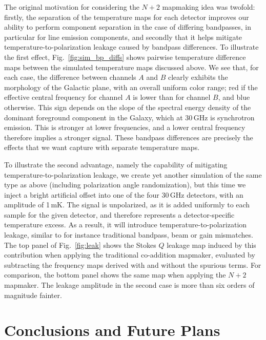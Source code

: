 \documentclass{aa}
\begin{document}
The original motivation for considering the $N+2$ mapmaking idea was twofold: firstly, the separation of the temperature maps for each detector improves our ability to perform component separation in the case of differing bandpasses, in particular for line emission components, and secondly that it helps mitigate temperature-to-polarization leakage caused by bandpass differences. To illustrate the first effect, Fig.~\ref{fig:sim_bp_diffs} shows pairwise temperature difference maps between the simulated temperature maps discussed above. We see that, for each case, the difference between channels $A$ and $B$ clearly exhibits the morphology of the Galactic plane, with an overall uniform color range; red if the effective central frequency for channel $A$ is lower than for channel $B$, and blue otherwise. This sign depends on the slope of the spectral energy density of the dominant foreground component in the Galaxy, which at 30\,GHz is synchrotron emission. This is stronger at lower frequencies, and a lower central frequency therefore implies a stronger signal. These bandpass differences are precisely the effects that we want capture with separate temperature maps.

To illustrate the second advantage, namely the capability of mitigating temperature-to-polarization leakage, we create yet another simulation of the same type as above (including polarization angle randomization), but this time we inject a bright artificial offset into one of the four 30\,GHz detectors, with an amplitude of 1\,mK. The signal is unpolarized, as it is added uniformly to each sample for the given detector, and therefore represents a detector-specific temperature excess. As a result, it will introduce temperature-to-polarization leakage, similar to for instance traditional bandpass, beam or gain mismatches. The top panel of Fig.~\ref{fig:leak} shows the Stokes $Q$ leakage map induced by this contribution when applying the traditional co-addition mapmaker, evaluated by subtracting the frequency maps derived with and without the spurious terms. For comparison, the bottom panel shows the same map when applying the $N+2$ mapmaker. The leakage amplitude in the second case is more than six orders of magnitude fainter. 

\section{Conclusions and Future Plans}
\label{sec:conclusions}
\end{document}
